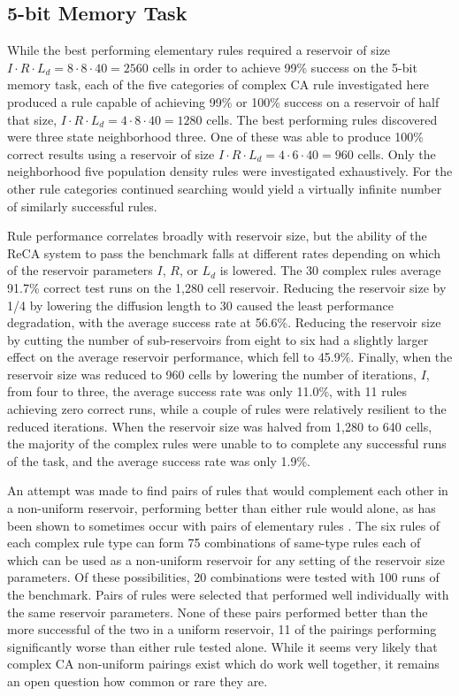 \documentclass{elsarticle}
\begin{document}
\begin{multicols}{2}
   \subsection{5-bit Memory Task}
While the best performing elementary rules required a reservoir of size $I \cdot R 
\cdot L_{d} = 8 \cdot 8 \cdot 40 = 2560$ cells in order to achieve 99\% success on the 
5-bit memory task, each of the five categories of complex CA rule investigated 
here produced a rule capable of achieving 99\% or 100\% success on a reservoir 
of half that size, $I \cdot R \cdot L_{d} = 4 \cdot 8 \cdot 40 = 1280$ cells. The best 
performing rules discovered were three state neighborhood three. One of these 
was able to produce 100\% correct results using a reservoir of size $I \cdot R \cdot 
L_{d} = 4 \cdot 6 \cdot 40 = 960$ cells. Only the neighborhood five population density 
rules were investigated exhaustively.  For the other rule categories continued 
searching would yield a virtually infinite number of similarly successful 
rules. \par Rule performance correlates broadly with reservoir size, but the 
ability of the ReCA system to  pass the benchmark falls at different rates 
depending on which of the reservoir parameters $I$, $R$, or $L_{d}$ is lowered.  
The 30 complex rules average 91.7\% correct test runs on the 1,280 cell 
reservoir.  Reducing the reservoir size by 1/4 by lowering the diffusion length 
to 30 caused the least performance degradation, with the average success rate 
at 56.6\%. Reducing the reservoir size by cutting the number of sub-reservoirs 
from eight to six had a slightly larger effect on the average reservoir 
performance, which fell to 45.9\%.  Finally, when the reservoir size was 
reduced to 960 cells by lowering the number of iterations, $I$, from four to 
three, the average success rate was only 11.0\%, with 11 rules achieving zero 
correct runs, while a  couple of rules were  relatively resilient to the 
reduced iterations. When the reservoir size was halved from 1,280 to 640  
cells, the majority of the complex rules were unable to to complete any 
successful runs of the task, and the average success rate was only 1.9\%. \par 
An attempt was made to find pairs of rules that would complement each other in 
a non-uniform reservoir, performing better than either rule would alone, as has 
been shown to sometimes occur with pairs of elementary rules 
\cite{nichele2017reservoir}. The six rules of each complex rule type can form 
75 combinations of same-type rules each of which can be used as a non-uniform 
reservoir for  any setting of the reservoir size parameters. Of these 
possibilities, 20 combinations were tested with 100 runs of the benchmark.  
Pairs of rules were selected that performed well individually with the same 
reservoir parameters.  None of these pairs performed better than the more 
successful of the two in a uniform reservoir, 11 of the pairings performing 
significantly worse than either rule tested alone. While it seems very likely 
that complex CA non-uniform pairings exist which do work well together, it 
remains an open question how common or rare they are.
 


\end{multicols}
\end{document}
